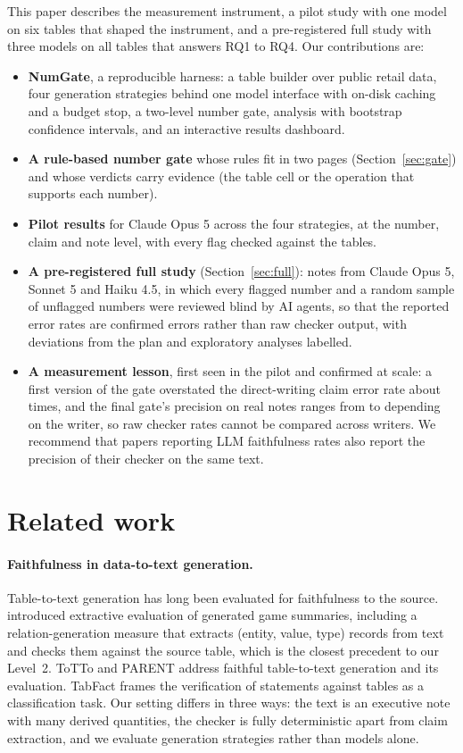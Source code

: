 \documentclass[11pt]{article}
\begin{document}
This paper describes the measurement instrument, a pilot study with one model on six tables that shaped the instrument, and a pre-registered full study with three models on all \NTables{} tables that answers RQ1 to RQ4. Our contributions are:
\begin{itemize}
  \item \textbf{NumGate}, a reproducible harness: a table builder over public retail data, four generation strategies behind one model interface with on-disk caching and a budget stop, a two-level number gate, analysis with bootstrap confidence intervals, and an interactive results dashboard.
  \item \textbf{A rule-based number gate} whose rules fit in two pages (Section~\ref{sec:gate}) and whose verdicts carry evidence (the table cell or the operation that supports each number).
  \item \textbf{Pilot results} for Claude Opus 5 across the four strategies, at the number, claim and note level, with every flag checked against the tables.
  \item \textbf{A pre-registered full study} (Section~\ref{sec:full}): \FullNotes{} notes from Claude Opus 5, Sonnet 5 and Haiku 4.5, in which every flagged number and a random sample of unflagged numbers were reviewed blind by AI agents, so that the reported error rates are confirmed errors rather than raw checker output, with deviations from the plan and exploratory analyses labelled.
  \item \textbf{A measurement lesson}, first seen in the pilot and confirmed at scale: a first version of the gate overstated the direct-writing claim error rate about \VoneRatio{} times, and the final gate's precision on real notes ranges from \PrecSonnet{} to \PrecHaiku{} depending on the writer, so raw checker rates cannot be compared across writers. We recommend that papers reporting LLM faithfulness rates also report the precision of their checker on the same text.
\end{itemize}

\section{Related work}

\paragraph{Faithfulness in data-to-text generation.} Table-to-text generation has long been evaluated for faithfulness to the source. \citet{wiseman2017challenges} introduced extractive evaluation of generated game summaries, including a relation-generation measure that extracts (entity, value, type) records from text and checks them against the source table, which is the closest precedent to our Level~2. ToTTo \citep{parikh2020totto} and PARENT \citep{dhingra2019parent} address faithful table-to-text generation and its evaluation. TabFact \citep{chen2020tabfact} frames the verification of statements against tables as a classification task. Our setting differs in three ways: the text is an executive note with many derived quantities, the checker is fully deterministic apart from claim extraction, and we evaluate generation strategies rather than models alone.
\end{document}
